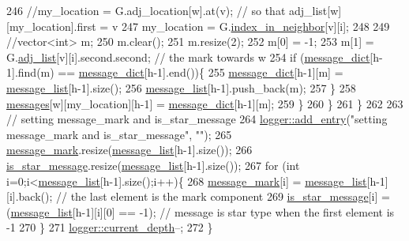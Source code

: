 \begin{DoxyCode}
246         \textcolor{comment}{//my\_location = G.adj\_location[w].at(v); // so that adj\_list[w][my\_location].first = v}
247         my\_location = G.\hyperlink{classmarked__graph_aee10b537408de42476609c1e45c075d0}{index\_in\_neighbor}[v][i];
248 
249         \textcolor{comment}{//vector<int> m;}
250         m.clear();
251         m.resize(2);
252         m[0] = -1;
253         m[1] = G.\hyperlink{classmarked__graph_a1a0bf7ca413a278763f7c878b3b6fd6f}{adj\_list}[v][i].second.second; \textcolor{comment}{// the mark towards w}
254         \textcolor{keywordflow}{if} (\hyperlink{classgraph__message_ab54d89b122c2b1322da0d5db2043fb84}{message\_dict}[h-1].find(m) == \hyperlink{classgraph__message_ab54d89b122c2b1322da0d5db2043fb84}{message\_dict}[h-1].end())\{
255           \hyperlink{classgraph__message_ab54d89b122c2b1322da0d5db2043fb84}{message\_dict}[h-1][m] = \hyperlink{classgraph__message_aa17fdb629b423343edfafa97252763ef}{message\_list}[h-1].size();
256           \hyperlink{classgraph__message_aa17fdb629b423343edfafa97252763ef}{message\_list}[h-1].push\_back(m);
257         \}
258         \hyperlink{classgraph__message_aac77e098f0acf9650116a8e51fe3b4b7}{messages}[w][my\_location][h-1] = \hyperlink{classgraph__message_ab54d89b122c2b1322da0d5db2043fb84}{message\_dict}[h-1][m];
259       \}
260     \}
261   \}
262 
263   \textcolor{comment}{// setting message\_mark and is\_star\_message}
264   \hyperlink{classlogger_a710163deb17bc81f70d53d285b8ac9ac}{logger::add\_entry}(\textcolor{stringliteral}{"setting message\_mark and is\_star\_message"}, \textcolor{stringliteral}{""});
265   \hyperlink{classgraph__message_a49d9af5150daf0599c29fe18cb032fa5}{message\_mark}.resize(\hyperlink{classgraph__message_aa17fdb629b423343edfafa97252763ef}{message\_list}[h-1].size());
266   \hyperlink{classgraph__message_a55ff5531a0043106369e84a7bc45e22d}{is\_star\_message}.resize(\hyperlink{classgraph__message_aa17fdb629b423343edfafa97252763ef}{message\_list}[h-1].size());
267   \textcolor{keywordflow}{for} (\textcolor{keywordtype}{int} i=0;i<\hyperlink{classgraph__message_aa17fdb629b423343edfafa97252763ef}{message\_list}[h-1].size();i++)\{
268     \hyperlink{classgraph__message_a49d9af5150daf0599c29fe18cb032fa5}{message\_mark}[i] = \hyperlink{classgraph__message_aa17fdb629b423343edfafa97252763ef}{message\_list}[h-1][i].back(); \textcolor{comment}{// the last element is the mark
       component}
269     \hyperlink{classgraph__message_a55ff5531a0043106369e84a7bc45e22d}{is\_star\_message}[i] = (\hyperlink{classgraph__message_aa17fdb629b423343edfafa97252763ef}{message\_list}[h-1][i][0] == -1); \textcolor{comment}{// message is star
       type when the first element is -1}
270   \}
271   \hyperlink{classlogger_a9d29b49bd318a719a8e85b59eac54fe0}{logger::current\_depth}--;
272 \}
\end{DoxyCode}



